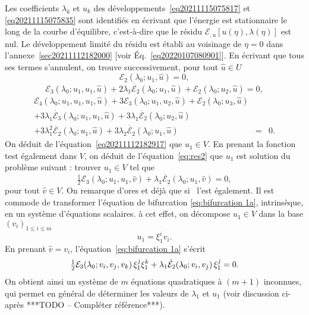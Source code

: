 \documentclass{article}
\begin{document}
Les coefficients $\lambda_k$ et $u_k$ des
développements~\eqref{eq20211115075817} et \eqref{eq20211115075835} sont
identifiés en écrivant que l'énergie est stationnaire le long de
la courbe d'équilibre, c'est-à-dire que le résidu $\mathcal{E}_{,
u}  [u (\eta), \lambda (\eta)]$ est nul. Le développement limité du
résidu est établi au voisinage de $\eta = 0$ dans
l'annexe~\ref{sec20211112182000} [voir Éq.~\eqref{eq20220107080901}]. En
écrivant que tous ses termes s'annulent, on trouve successivement, pour
tout $\hat{u} \in U$
\begin{equation}
  \label{eq20211112182917} \mathcal{E}_2 (\lambda_0 ; u_1, \hat{u}) = 0,
\end{equation}
\begin{equation}
  \label{eq:res2} \mathcal{E}_3 (\lambda_0 ; u_1, u_1, \hat{u}) + 2 \lambda_1
  \dot{\mathcal{E}_2} (\lambda_0 ; u_1, \hat{u}) +\mathcal{E}_2 (\lambda_0 ;
  u_2, \hat{u}) = 0,
\end{equation}
\begin{eqnarray}
  \mathcal{E}_4 (\lambda_0 ; u_1, u_1, u_1, \hat{u}) + 3\mathcal{E}_3
  (\lambda_0 ; u_1, u_2, \hat{u}) +\mathcal{E}_2 (\lambda_0 ; u_3, \hat{u}) &
  &  \nonumber\\
  + 3 \lambda_1  \dot{\mathcal{E}_3} (\lambda_0 ; u_1, u_1, \hat{u}) + 3
  \lambda_1  \dot{\mathcal{E}_2} (\lambda_0 ; u_2, \hat{u}) &  &  \nonumber\\
  + 3 \lambda_1^2  \ddot{\mathcal{E}_2} (\lambda_0 ; u_1, \hat{u}) + 3
  \lambda_2  \dot{\mathcal{E}_2} (\lambda_0 ; u_1, \hat{u}) & = & 0.
  \label{eq:res3}
\end{eqnarray}
On déduit de l'équation~\eqref{eq20211112182917} que $u_1 \in V$. En
prenant la fonction test également dans $V$, on déduit de
l'équation~\eqref{eq:res2} que $u_1$ est solution du problème suivant
: trouver $u_1 \in V$ tel que
\begin{equation}
  \label{eq:bifurcation 1a} \tfrac{1}{2} \mathcal{E}_3 (\lambda_0 ; u_1, u_1,
  \hat{v}) + \lambda_1  \dot{\mathcal{E}_2} (\lambda_0 ; u_1, \hat{v}) = 0,
\end{equation}
pour tout $\hat{v} \in V$. On remarque d'ores et déjà que si \ l'est
également. Il est commode de transformer l'équation de bifurcation
\eqref{eq:bifurcation 1a}, intrinsèque, en un système d'équations
scalaires. à cet effet, on décompose $u_1 \in V$ dans la base
$(v_i)_{1 \leqslant i \leqslant m}$
\begin{equation}
  \label{eq:decomposition u1} u_1 = \xi_1^i v_i .
\end{equation}
En prenant $\hat{v} = v_i$, l'équation~\eqref{eq:bifurcation 1a}
s'écrit
\begin{equation}
  \label{eq:bifurcation 1b} \tfrac{1}{2} \mathcal{E}_3 (\lambda_0 ; v_i, v_j,
  v_k)  \hspace{0.17em} \xi_1^j \xi_1^k + \lambda_1  \dot{\mathcal{E}}_2
  (\lambda_0 ; v_i, v_j)  \hspace{0.17em} \xi_1^j = 0.
\end{equation}
On obtient ainsi un système de $m$ équations quadratiques à $(m +
1)$ inconnues, qui permet en général de déterminer les valeurs de
$\lambda_1$ et $u_1$ (voir discussion ci-après ***TODO -- Compléter
référence***).
\end{document}
